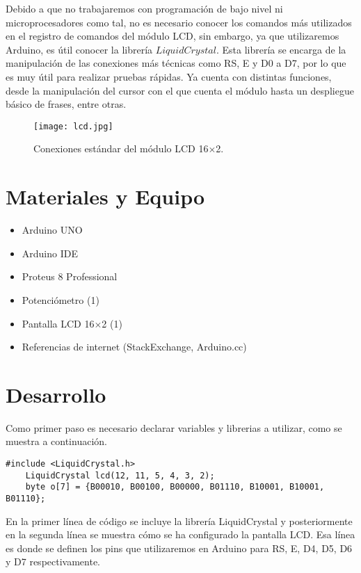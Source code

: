 \documentclass[12pt, letterpaper]{article}
\begin{document}
Debido a que no trabajaremos con programación de bajo nivel ni microprocesadores como tal, no es necesario conocer los comandos más utilizados en el registro de comandos del módulo LCD, sin embargo, ya que utilizaremos Arduino, es útil conocer la librería $LiquidCrystal$. Esta librería se encarga de la manipulación de las conexiones más técnicas como RS, E y D0 a D7, por lo que es muy útil para realizar pruebas rápidas. Ya cuenta con distintas funciones, desde la manipulación del cursor con el que cuenta el módulo hasta un despliegue básico de frases, entre otras.

\begin{figure}[H]
	\centering
	\texttt{[image: lcd.jpg]}
	\caption{Conexiones estándar del módulo LCD 16$\times$2.}
\end{figure}

\section*{Materiales y Equipo}
\begin{itemize}
	\item Arduino UNO
	\item Arduino IDE
	\item Proteus 8 Professional
	\item Potenciómetro (1)
	\item Pantalla LCD 16$\times$2 (1)
	\item Referencias de internet (StackExchange, Arduino.cc)
\end{itemize}

\section*{Desarrollo}

Como primer paso es necesario declarar variables y librerias a utilizar, como se muestra a continuación.
\begin{lstlisting}[language=Arduino]
	#include <LiquidCrystal.h>
	LiquidCrystal lcd(12, 11, 5, 4, 3, 2);
	byte o[7] = {B00010, B00100, B00000, B01110, B10001, B10001, B01110};
\end{lstlisting}

En la primer línea de código se incluye la librería LiquidCrystal y posteriormente en la segunda línea se muestra cómo se ha configurado la pantalla LCD. Esa línea es donde se definen los pins que utilizaremos en Arduino para RS, E, D4, D5, D6 y D7 respectivamente.
\end{document}
